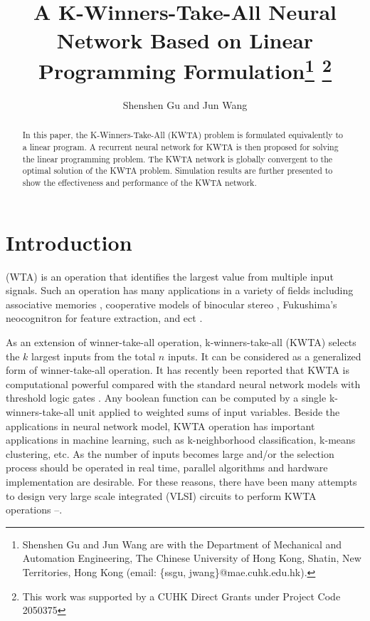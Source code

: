 \documentclass[conference]{IEEEtran}
\begin{document}
\title{\ \\ \LARGE\bf A K-Winners-Take-All Neural Network Based on Linear Programming Formulation\thanks{Shenshen Gu and Jun Wang are with the Department of Mechanical and Automation Engineering, The Chinese University of Hong Kong, Shatin, New Territories, Hong Kong (email: \{ssgu, jwang\}@mae.cuhk.edu.hk).} \thanks{This work was supported by a CUHK Direct Grants under Project Code
2050375}}

\author{Shenshen Gu and Jun Wang}


\maketitle

\begin{abstract}
In this paper, the K-Winners-Take-All (KWTA) problem is formulated
equivalently to a linear program. A recurrent neural network for
KWTA is then proposed for solving the linear programming problem.
The KWTA network is globally convergent to the optimal solution of
the KWTA problem. Simulation results are further presented to show
the effectiveness and performance of the KWTA network.
\end{abstract}


\section{Introduction}


 (WTA) is an operation that identifies
the largest value from multiple input signals. Such an operation has
many applications in a variety of fields including associative
memories \cite{cit:1}, cooperative models of binocular stereo
\cite{cit:2}, Fukushima's neocognitron for feature extraction, and
ect \cite{cit:3}.

As an extension of winner-take-all operation, k-winners-take-all
(KWTA) selects the $k$ largest inputs from the total $n$ inputs. It
can be considered as a generalized form of winner-take-all
operation. It has recently been reported that KWTA is computational
powerful compared with the standard neural network models with
threshold logic gates \cite{cit:4}\cite{cit:5}. Any boolean function
can be computed by a single k-winners-take-all unit applied to
weighted sums of input variables. Beside the applications in neural
network model, KWTA operation has important applications in machine
learning, such as k-neighborhood classification, k-means clustering,
etc. As the number of inputs becomes large and/or the selection
process should be operated in real time, parallel algorithms and
hardware implementation are desirable. For these reasons, there have
been many attempts to design very large scale integrated (VLSI)
circuits to perform KWTA operations \cite{cit:6}--\cite{cit:29}.
\end{document}
